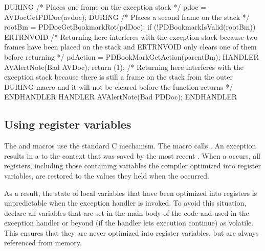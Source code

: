 \documentclass[letterpaper,12pt,english,openany,oneside]{sphinxmanual}
\begin{document}
\begin{sphinxVerbatim}[commandchars=\\\{\}]
\PYGZob{}
 DURING /* Places one frame on the exception stack */
 pdoc = AVDocGetPDDoc(avdoc);
     DURING /* Places a second frame on the stack */
         rootBm = PDDocGetBookmarkRot(pdDoc);
         if (!PDBookmarkIsValid(rootBm))\PYGZob{}
         E\PYGZus{}RTRN\PYGZus{}VOID
         /*
         Returning here interferes with the exception stack
         because two frames have been placed on the stack
         and E\PYGZus{}RTRN\PYGZus{}VOID only clears one of them before
         returning
         */
 \PYGZcb{}
 pdAction = PDBookMarkGetAction(parentBm);
 HANDLER
         AVAlertNote(\PYGZdq{}Bad AVDoc\PYGZdq{});
         return (1);
         /*
         Returning here interferes with the exception stack
         because there is still a frame on the stack from
         the outer DURING macro and it will not be cleared
         before the function returns
         */
 END\PYGZus{}HANDLER
 HANDLER
     AVAlertNote(\PYGZdq{}Bad PDDoc\PYGZdq{});
 END\PYGZus{}HANDLER
 \PYGZcb{}
\end{sphinxVerbatim}


\subsection{Using register variables}
\label{\detokenize{Plugins_Exceptions:using-register-variables}}
The  and  macros use the standard C  mechanism. The  macro calls . An exception results in a  to the context that was saved by the most recent . When a  occurs, all registers, including those containing variables the compiler optimized into register variables, are restored to the values they held when the  occurred.

As a result, the state of local variables that have been optimized into registers is unpredictable when the exception handler is invoked. To avoid this situation, declare all variables that are set in the main body of the code and used in the exception handler or beyond (if the handler lets execution continue) as volatile. This ensures that they are never optimized into register variables, but are always referenced from memory.
\end{document}
